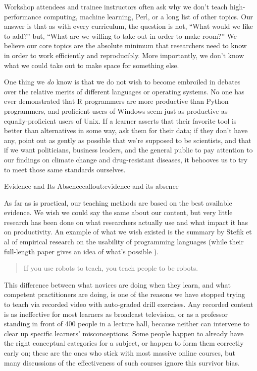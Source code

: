 
Workshop attendees and trainee instructors often ask why we don't teach
high-performance computing, machine learning, Perl, or a long list of
other topics. Our answer is that as with every curriculum, the question
is not, ``What would we like to add?'' but, ``What are we willing to
take out in order to make room?'' We believe our core topics are the
absolute minimum that researchers need to know in order to work
efficiently and reproducibly. More importantly, we don't know what we
could take out to make space for something else.

One thing we \emph{do} know is that we do not wish to become embroiled
in debates over the relative merits of different languages or operating
systems. No one has ever demonstrated that R programmers are more
productive than Python programmers, and proficient users of Windows seem
just as productive as equally-proficient users of Unix. If a learner
asserts that their favorite tool is better than alternatives in some
way, ask them for their data; if they don't have any, point out as
gently as possible that we're supposed to be scientists, and that if we
want politicians, business leaders, and the general public to pay
attention to our findings on climate change and drug-resistant diseases,
it behooves us to try to meet those same standards ourselves.

\begin{callout}{Evidence and Its Absence}{callout:evidence-and-its-absence}

As far as is practical, our teaching methods are based on the best
available evidence. We wish we could say the same about our content, but
very little research has been done on what researchers actually use and
what impact it has on productivity. An example of what we wish existed
is the summary by Stefik et al of empirical research on the usability of
programming languages \cite{bib:stefik-summary}
(while
their  full-length paper gives an idea of what's possible \cite{bib:stefik-fixme}).
\end{callout}


\begin{quote}
If you use robots to teach, you teach people to be robots.
\end{quote}

This difference between what novices are doing when they learn, and what
competent practitioners are doing, is one of the reasons we have stopped
trying to teach via recorded video with auto-graded drill exercises. Any
recorded content is as ineffective for most learners as broadcast
television, or as a professor standing in front of 400 people in a
lecture hall, because neither can intervene to clear up specific
learners' misconceptions. Some people happen to already have the right
conceptual categories for a subject, or happen to form them correctly
early on; these are the ones who stick with most massive online courses,
but many discussions of the effectiveness of such courses ignore this
survivor bias.

